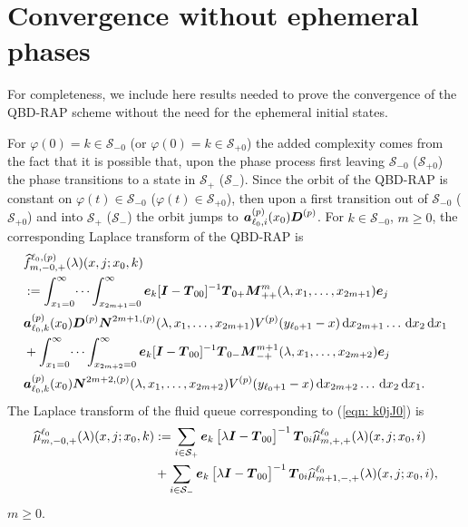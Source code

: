 \chapter{Convergence without ephemeral phases\label{app:extend conv}}
For completeness, we include here results needed to prove the convergence of the QBD-RAP scheme without the need for the ephemeral initial states.

For \(\varphi(0)=k\in\mathcal S_{-0}\) (or \(\varphi(0)=k\in\mathcal S_{+0}\)) the added complexity comes from the fact that it is possible that, upon the phase process first leaving \(\mathcal S_{-0}\) (\(\mathcal S_{+0}\)) the phase transitions to a state in \(\mathcal S_+\) (\(\mathcal S_-\)). Since the orbit of the QBD-RAP is constant on \(\varphi(t)\in\mathcal S_{-0}\) (\(\varphi(t)\in\mathcal S_{+0}\)), then upon a first transition out of \(\mathcal S_{-0}\) (\(\mathcal S_{+0}\)) and into \(\mathcal S_+\) (\(\mathcal S_-\)) the orbit jumps to \(\boldsymbol   a_{\ell_0,i}^{(p)}(x_0)\boldsymbol D^{(p)}\). For \(k\in\mathcal S_{-0}\), \(m\geq 0\), the corresponding Laplace transform of the QBD-RAP is
\begin{align}
	&\widehat{f}_{m,-0,+}^{\ell_0,(p)}(\lambda)(x,j;x_0,k)\nonumber 
	\\&:=\int_{x_1=0}^\infty \dots \int_{x_{2m+1}=0}^\infty  \boldsymbol e_k [\boldsymbol I - \boldsymbol T_{00}]^{-1}\boldsymbol T_{0+}\boldsymbol M^m_{++}(\lambda,x_1,\dots,x_{2m+1})\boldsymbol e_j \nonumber
	\\& \boldsymbol a_{\ell_0,k}^{(p)}(x_0) \boldsymbol D^{(p)} \boldsymbol N^{2m+1,(p)}(\lambda,x_1,\dots,x_{2m+1}) V^{(p)}(y_{\ell_0+1}-x)\, \mathrm{d} x_{2m+1}\dots\, \mathrm{d} x_2 \, \mathrm{d} x_1  \nonumber
	\\& + \int_{x_1=0}^\infty \dots \int_{x_{2m+2}=0}^\infty  \boldsymbol e_k [\boldsymbol I - \boldsymbol T_{00}]^{-1}\boldsymbol T_{0-}\boldsymbol M^{m+1}_{-+}(\lambda,x_1,\dots,x_{2m+2})\boldsymbol e_j \nonumber
	\\& \boldsymbol a_{\ell_0,k}^{(p)}(x_0)\boldsymbol N^{2m+2,(p)}(\lambda,x_1,\dots,x_{2m+2}) V^{(p)}(y_{\ell_0+1}-x)\, \mathrm{d} x_{2m+2}\dots\, \mathrm{d} x_2 \, \mathrm{d} x_1.
	\label{eqn: k0jJ0}
\end{align}
The Laplace transform of the fluid queue corresponding to (\ref{eqn: k0jJ0}) is 
\begin{align}
	\widehat \mu_{m,-0,+}^{\ell_0}(\lambda)(x,j;x_0,k) \nonumber 
	&:= \sum_{i\in\mathcal{S}_+}\boldsymbol e_k\begin{bmatrix} \lambda \boldsymbol I - \boldsymbol T_{00} \end{bmatrix}^{-1}\boldsymbol T_{0i}\widehat \mu_{m,+,+}^{\ell_0}(\lambda)(x,j;x_0,i) 
	\\&{}+ \sum_{i\in\mathcal{S}_-}\boldsymbol e_k\begin{bmatrix} \lambda \boldsymbol I - \boldsymbol T_{00} \end{bmatrix}^{-1}\boldsymbol T_{0i}\widehat \mu_{m+1,-,+}^{\ell_0}(\lambda)(x,j;x_0,i), \label{eqn: s0- actual}
\end{align}
\(m\geq 0\).

